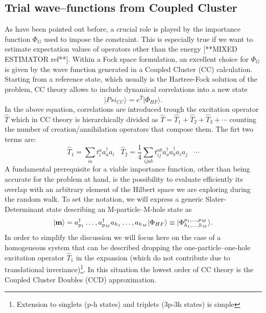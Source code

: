 \subsection{Trial wave--functions from Coupled Cluster}
As have been pointed out before, a crucial role is played by the
importance function $\Phi_G$ used to impose the constraint. This is especially true if we want
to estimate expectation values of operators other than the energy [**MIXED ESTIMATOR ref**].
Within a Fock space formulation, an excellent choice for $\Phi_G$ is given by the wave 
function generated in a Coupled Cluster (CC) calculation. Starting from a reference state,
which usually is the Hartree-Fock solution of the problem, CC theory allows to
include dynamical correlations into a new state
\begin{equation}
\vert Psi_{CC}\rangle = e^{\hat{T}}\vert \Phi_{HF} \rangle.
\end{equation}
In the above equation, correlations are introduced trough the excitation operator $\hat{T}$ which
in CC theory is hierarchically divided as $\hat{T}=\hat{T}_1+\hat{T}_2 + \hat{T}_3+\cdots$ counting
the number of creation/annihilation operators that compose them. The firt two terms are:
\begin{equation}
\hat{T}_1=\sum_{ia} t_i^a a^{\dagger}_a a_i
 \;\;\; \hat{T}_2=\frac{1}{4}\sum_{ijab} t_{ij}^{ab} a^{\dagger}_a a^{\dagger}_b a_i a_j \;\;\; \cdots
\end{equation}
A fundamental prerequisite for a viable importance function, other than being accurate for 
the problem at hand, is the possibility to evaluate efficiently its overlap with an arbitrary 
element of the Hilbert space we are exploring during the random walk.
To set the notation, we will express a generic Slater-Determinant state describing an 
M-particle--M-hole state as
\begin{equation}
\rvert {\bf m}\rangle= a^\dagger_{p_1}\dots,a^\dagger_{p_M}a_{h_1}\dots,a_{h_M} \vert \Phi_{HF} \rangle \equiv \; \rvert \Phi^{p_1,\dots,p_M}_{h_1,\dots,h_M} \rangle.
\end{equation}
In order to simplify the discussion we will focus here on the case of a homogeneous system 
that can be described dropping the one-particle--one-hole excitation operator $\hat{T}_1$ in 
the expansion (which do not contribute due to translational inveriance)\footnote{Extension to singlets (p-h states) and triplets (3p-3h states) is simple}. 
In this situation the lowest order of CC theory is the Coupled Cluster Doubles (CCD) approximation.

